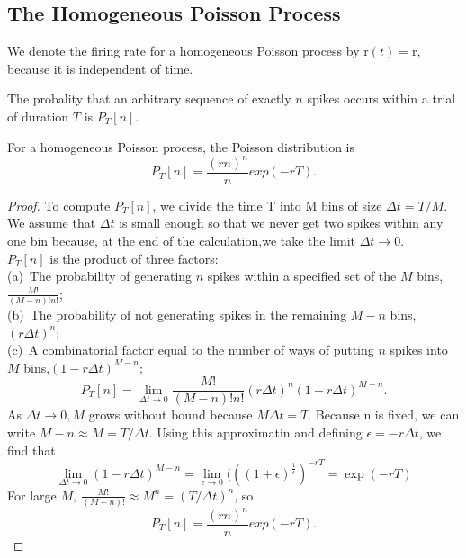 \subsection{The Homogeneous Poisson Process}

\begin{ntn}
    We denote the firing rate for a homogeneous Poisson process by r$(t)=$r, because it is independent of time.
\end{ntn}

\begin{defn}
     The probality that an arbitrary sequence of exactly $n$ spikes occurs within a trial of duration $T$ is $P_T[n]$.
\end{defn}

\begin{thm}
    For a homogeneous Poisson process, the Poisson distribution is 
    \begin{equation}
        P_T[n]=\frac{(rn)^n}{n}exp(-rT).
        \label{equ:1.29}
    \end{equation}
    \begin{proof}
        To compute $P_T[n]$, we divide the time T into M bins of size $\Delta t =T/M$. We assume that $\Delta t$ is small enough so that we never get two spikes within any one bin because, at the end of the calculation,we take the limit $\Delta t \to 0$.\\
        $P_T[n]$ is the product of three factors: \\
            (a)\ The probability of generating $n$ spikes within a  specified set of the $M$ bins,$\frac{M!}{(M-n)!n!}$;\\
            (b)\ The probability of not generating spikes in the remaining $M - n$ bins,$(r\Delta t)^n$;\\
            (c)\ A combinatorial factor equal to the number of ways of putting $n$ spikes into $M$ bins,$(1-r\Delta t)^{M-n}$; \\
            \begin{equation}
            \label{equ:1.27}
            P_T[n]=\lim_{\Delta t \to 0}\frac{M!}{(M-n)!n!}(r\Delta t)^n(1-r\Delta t)^{M-n}.
        \end{equation}
        As $\Delta t \to 0, M$ grows without bound because $ M\Delta t=T$. Because n is fixed, we can write $M-n\approx M=T/\Delta t$. Using this approximatin and defining $\epsilon=-r\Delta t$, we find that 
        \begin{equation}
            \lim_{\Delta t \to 0}(1-r\Delta t)^{M-n}=\lim_{\epsilon\to 0}(((1+\epsilon)^{\frac{1}{\epsilon}})^{-rT}=\exp(-rT)
        \end{equation}
        For large $M,\ \frac{M!}{(M-n)!}\approx M^n=(T/\Delta t)^n$, so
        \begin{equation}            
            P_T[n]=\frac{(rn)^n}{n}exp(-rT).
        \end{equation}
    \end{proof}
\end{thm}

